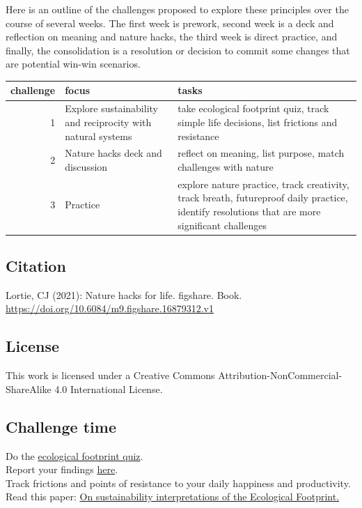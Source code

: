 \documentclass[
]{book}
\begin{document}
Here is an outline of the challenges proposed to explore these principles over the course of several weeks. The first week is prework, second week is a deck and reflection on meaning and nature hacks, the third week is direct practice, and finally, the consolidation is a resolution or decision to commit some changes that are potential win-win scenarios.

\begin{tabular}{rll}
\toprule
challenge & focus & tasks\\
\midrule
1 & Explore sustainability and reciprocity with natural systems & take ecological footprint quiz, track simple life decisions, list frictions and resistance\\
2 & Nature hacks deck and discussion & reflect on meaning, list purpose, match challenges with nature\\
3 & Practice & explore nature practice, track creativity, track breath, futureproof daily practice, identify resolutions that are more significant challenges\\
\bottomrule
\end{tabular}

\hypertarget{citation}{%
\subsection*{Citation}\label{citation}}

Lortie, CJ (2021): Nature hacks for life. figshare. Book. \url{https://doi.org/10.6084/m9.figshare.16879312.v1}

\hypertarget{license}{%
\subsection*{License}\label{license}}

This work is licensed under a Creative Commons Attribution-NonCommercial-ShareAlike 4.0 International License.

\hypertarget{challenge-time}{%
\subsection*{Challenge time}\label{challenge-time}}

Do the \href{https://www.footprintcalculator.org/home/en}{ecological footprint quiz}.\\
Report your findings \href{https://forms.gle/s7wqpoFZh8ZJZPrz6}{here}.\\
Track frictions and points of resistance to your daily happiness and productivity.\\
Read this paper: \href{https://www.sciencedirect.com/science/article/pii/S092180091930518X?casa_token=K0Ms5gASF7YAAAAA:1NgRSJdbMDvAqIV_yEgJKoscztxm6ktNod5m_sCbSm7NZfyRMwZd9hvcqZwQzPNF-0rBDUTJGiw}{On sustainability interpretations of the Ecological Footprint.}
\end{document}
